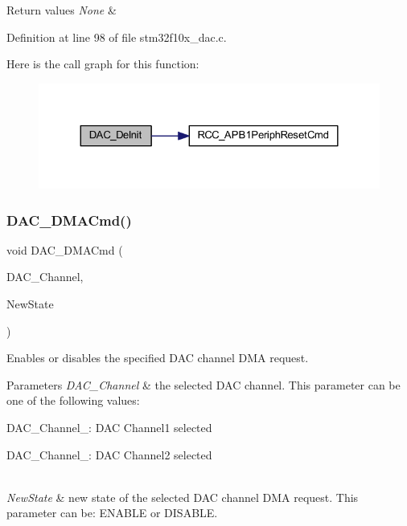 \begin{DoxyRetVals}{Return values}
{\em None} & \\
\hline
\end{DoxyRetVals}


Definition at line 98 of file stm32f10x\+\_\+dac.\+c.

Here is the call graph for this function\+:
\nopagebreak
\begin{figure}[H]
\begin{center}
\leavevmode
\includegraphics[width=324pt]{group___d_a_c___private___functions_ga1fae225204e1e049d6795319e99ba8bc_cgraph}
\end{center}
\end{figure}
\mbox{\label{group___d_a_c___private___functions_ga194cba38f60ace11658824f0250121f4}} 
\subsubsection{\texorpdfstring{D\+A\+C\+\_\+\+D\+M\+A\+Cmd()}{DAC\_DMACmd()}}
{\footnotesize\ttfamily void D\+A\+C\+\_\+\+D\+M\+A\+Cmd (\begin{DoxyParamCaption}\item[{uint32\+\_\+t}]{D\+A\+C\+\_\+\+Channel,  }\item[{\hyperlink{group___exported__types_gac9a7e9a35d2513ec15c3b537aaa4fba1}{Functional\+State}}]{New\+State }\end{DoxyParamCaption})}



Enables or disables the specified D\+AC channel D\+MA request. 


\begin{DoxyParams}{Parameters}
{\em D\+A\+C\+\_\+\+Channel} & the selected D\+AC channel. This parameter can be one of the following values\+: \begin{DoxyItemize}
\item D\+A\+C\+\_\+\+Channel\+\_\+: D\+AC Channel1 selected \item D\+A\+C\+\_\+\+Channel\+\_\+: D\+AC Channel2 selected \end{DoxyItemize}
\\
\hline
{\em New\+State} & new state of the selected D\+AC channel D\+MA request. This parameter can be\+: E\+N\+A\+B\+LE or D\+I\+S\+A\+B\+LE. \\
\hline
\end{DoxyParams}

